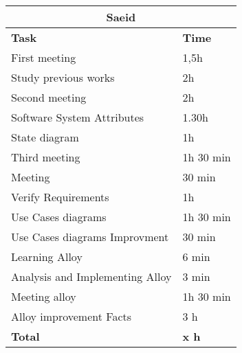 \begin{table}[H]
\begin{tabular}{|l|l|}
\hline
\multicolumn{2}{|c|}{\textbf{Saeid}}            \\ \hline
\textbf{Task}                   & \textbf{Time} \\ \hline
First meeting                   & 1,5h          \\ \hline
Study previous works            & 2h            \\ \hline
Second meeting                  & 2h            \\ \hline
Software System Attributes      & 1.30h         \\ \hline
State diagram                   & 1h            \\ \hline
Third meeting                   & 1h 30 min     \\ \hline
Meeting                         & 30 min        \\ \hline
Verify Requirements             & 1h            \\ \hline
Use Cases diagrams              & 1h 30 min     \\ \hline
Use Cases diagrams Improvment   & 30 min        \\ \hline
Learning Alloy                  & 6 min         \\ \hline
Analysis and Implementing Alloy & 3 min         \\ \hline
Meeting alloy                   & 1h 30 min     \\ \hline
Alloy improvement Facts         & 3 h           \\ \hline
\rowcolor {polilight}
\textbf{Total}                  & \textbf{x h}   \\ \hline
\end{tabular}
\end{table}
